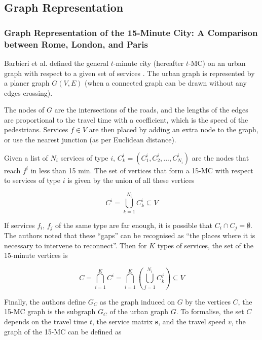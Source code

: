 \subsection{Graph Representation}

\subsubsection{Graph Representation of the 15-Minute City: A Comparison between Rome, London, and Paris}


Barbieri et al. defined the general $t$-minute city (hereafter $t$-MC) on an urban graph with respect to a given set of services \cite{barbieri_graph_2023}. The urban graph is represented by a planer graph $G(V,E)$ (when a connected graph can be drawn without any edges crossing).

The nodes of $G$ are the intersections of the roads, and the lengths of the edges are proportional to the travel time with a coefficient, which is the speed of the pedestrians. Services $f\in V$ are then placed by adding an extra node to the graph, or use the nearest junction (as per Euclidean distance).

Given a list of $N_i$ services of type $i$, $C^i_k=(C^i_1,C^i_2,...,C^i_{N_i})$ are the nodes that reach $f^i$ in less than 15 min. The set of vertices that form a 15-MC with respect to services of type $i$ is given by the union of all these vertices

$$ C^i=\bigcup_{k=1}^{N_i}C^i_k\subseteq V $$

If services $f_i$, $f_j$ of the same type are far enough, it is possible that $C_i\cap C_j=\emptyset$. The authors noted that these “gaps” can be recognised as “the places where it is necessary to intervene to reconnect”. Then for $K$ types of services, the set of the 15-minute vertices is

$$C=\bigcap^K_{i=1}C^i=\bigcap^K_{i=1}\left(\bigcup^{N_i}_{j=1}C^j_k\right)\subseteq V$$

Finally, the authors define $G_C$ as the graph induced on $G$ by the vertices $C$, the 15-MC graph is the subgraph $G_C$ of the urban graph $G$. To formalise, the set $C$ depends on the travel time $t$, the service matrix $\mathbf s$, and the travel speed $v$, the graph of the 15-MC can be defined as

